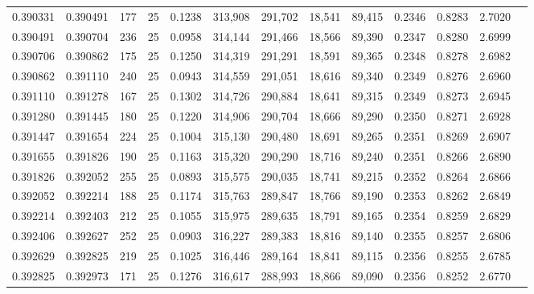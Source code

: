 \begin{tabular}{rrrrrrrrrrrrr}
0.390331 & 0.390491 &   177 &  25 &                                     0.1238 & 313,908 & 291,702 &  18,541 &  89,415 & 0.2346 & 0.8283 & 2.7020 \\
0.390491 & 0.390704 &   236 &  25 &                                     0.0958 & 314,144 & 291,466 &  18,566 &  89,390 & 0.2347 & 0.8280 & 2.6999 \\
0.390706 & 0.390862 &   175 &  25 &                                     0.1250 & 314,319 & 291,291 &  18,591 &  89,365 & 0.2348 & 0.8278 & 2.6982 \\
0.390862 & 0.391110 &   240 &  25 &                                     0.0943 & 314,559 & 291,051 &  18,616 &  89,340 & 0.2349 & 0.8276 & 2.6960 \\
0.391110 & 0.391278 &   167 &  25 &                                     0.1302 & 314,726 & 290,884 &  18,641 &  89,315 & 0.2349 & 0.8273 & 2.6945 \\
0.391280 & 0.391445 &   180 &  25 &                                     0.1220 & 314,906 & 290,704 &  18,666 &  89,290 & 0.2350 & 0.8271 & 2.6928 \\
0.391447 & 0.391654 &   224 &  25 &                                     0.1004 & 315,130 & 290,480 &  18,691 &  89,265 & 0.2351 & 0.8269 & 2.6907 \\
0.391655 & 0.391826 &   190 &  25 &                                     0.1163 & 315,320 & 290,290 &  18,716 &  89,240 & 0.2351 & 0.8266 & 2.6890 \\
0.391826 & 0.392052 &   255 &  25 &                                     0.0893 & 315,575 & 290,035 &  18,741 &  89,215 & 0.2352 & 0.8264 & 2.6866 \\
0.392052 & 0.392214 &   188 &  25 &                                     0.1174 & 315,763 & 289,847 &  18,766 &  89,190 & 0.2353 & 0.8262 & 2.6849 \\
0.392214 & 0.392403 &   212 &  25 &                                     0.1055 & 315,975 & 289,635 &  18,791 &  89,165 & 0.2354 & 0.8259 & 2.6829 \\
0.392406 & 0.392627 &   252 &  25 &                                     0.0903 & 316,227 & 289,383 &  18,816 &  89,140 & 0.2355 & 0.8257 & 2.6806 \\
0.392629 & 0.392825 &   219 &  25 &                                     0.1025 & 316,446 & 289,164 &  18,841 &  89,115 & 0.2356 & 0.8255 & 2.6785 \\
0.392825 & 0.392973 &   171 &  25 &                                     0.1276 & 316,617 & 288,993 &  18,866 &  89,090 & 0.2356 & 0.8252 & 2.6770 \\

\end{tabular}
